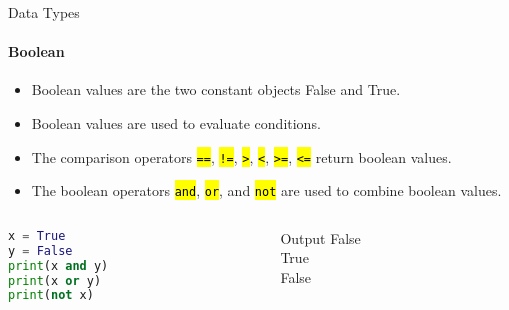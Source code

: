 \documentclass[
    aspectratio=169, 
    usepdftitle=false, 
    xcolor={dvipsnames},
    hyperref={
        colorlinks,
        linkcolor=black,
        urlcolor=blue}
    ]{beamer}
\let\OldTexttt\texttt
\renewcommand{\texttt}[1]{\OldTexttt{\hl{#1}}}%
\begin{document}
\begin{frame}[fragile]{Data Types}
    \framesubtitle{Boolean}
    \begin{itemize}
        \item Boolean values are the two constant objects False and True.
        \item Boolean values are used to evaluate conditions.
        \item The comparison operators \texttt{==}, \texttt{!=}, \texttt{>}, \texttt{<}, \texttt{>=}, \texttt{<=} return boolean values.
        \item The boolean operators \texttt{and}, \texttt{or}, and \texttt{not} are used to combine boolean values.
    \end{itemize}
    \begin{columns}
        \begin{column}{0.5\textwidth}
            \begin{lstlisting}[language=Python]
x = True
y = False
print(x and y)
print(x or y)
print(not x)
\end{lstlisting}
        \end{column}
        \begin{column}{0.4\textwidth}
            \begin{block}{Output}
                False\\
                True\\
                False
            \end{block}
        \end{column}
    \end{columns}
\end{frame}
\end{document}
